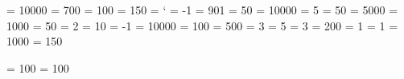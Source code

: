 \adjdemerits           = 10000
\binoppenalty          =   700
\brokenpenalty         =   100
\clubpenalty           =   150
     =   `\-
       =    -1
\delimiterfactor       =   901
\displaywidowpenalty   =    50
\doublehyphendemerits  = 10000
\errorcontextlines     =     5 
\exhyphenpenalty       =    50
\finalhyphendemerits   =  5000
\hbadness              =  1000
\hyphenpenalty         =    50
\lefthyphenmin         =     2 
\linepenalty           =    10
\newlinechar           =    -1
\predisplaypenalty     = 10000
\pretolerance          =   100
\relpenalty            =   500
\righthyphenmin        =     3
\showboxbreadth        =     5
\showboxdepth          =     3
\tolerance             =   200 
\tracinglostchars      =     1
\uchyph                =     1
\vbadness              =  1000
\widowpenalty          =   150


\newcount \interdisplaylinepenalty  
\newcount \interfootnotelinepenalty 

\interdisplaylinepenalty  = 100
\interfootnotelinepenalty = 100


